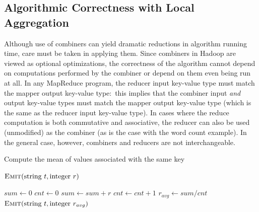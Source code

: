 \subsection{Algorithmic Correctness with Local Aggregation}
\label{chapter3:local-aggregation:correctness}

Although use of combiners can yield dramatic reductions in algorithm
running time, care must be taken in applying them.  Since combiners in
Hadoop are viewed as optional optimizations, the correctness of the
algorithm cannot depend on computations performed by the combiner or
depend on them even being run at all.  In any MapReduce program, the
reducer input key-value type must match the mapper output key-value
type:\ this implies that the combiner input \emph{and} output key-value
types must match the mapper output key-value type (which is the same
as the reducer input key-value type).  In cases where the reduce
computation is both commutative and associative, the reducer can also
be used (unmodified) as the combiner (as is the case with the word
count example).  In the general case, however, combiners and reducers
are not interchangeable.

\begin{algorithm}[t]
\caption{Compute the mean of values associated with the same key}
\label{algorithm:chapter3:average}
\algrenewcommand{}
\algrenewcommand{}
  \begin{algorithmic}[1]
    \State $\textsc{Emit}(\textrm{string }t, \textrm{integer }r)$
    \EndProcedure
    \EndFunction
  \end{algorithmic}

  \begin{algorithmic}[1]
    \State $sum \gets 0$
    \State $cnt \gets 0$
    \State $sum \gets sum + r$
    \State $cnt \gets cnt + 1$
    \EndFor
    \State $r_{avg} \gets sum/cnt$
    \State $\textsc{Emit}(\textrm{string }t, \textrm{integer } r_{avg})$
    \EndProcedure
    \EndFunction
  \end{algorithmic}
\end{algorithm}

